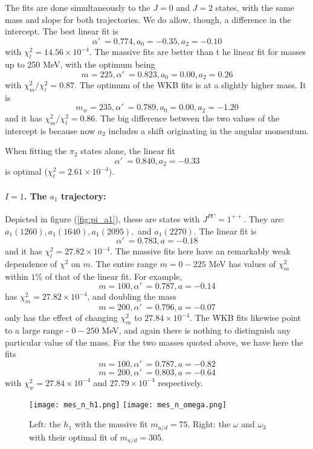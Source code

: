 \documentclass[11pt,a4]{article}
\newcommand{\alp}{\ensuremath{\alpha'\:}}
\newcommand{\rchi}[1]{\ensuremath{\chi^2_m/\chi^2_l = #1}}
\newcommand{\ten}[1]{\times10^{#1}}
\newcommand{\mud}{m_{u/d}}
\begin{document}
				The fits are done simultaneously to the \(J = 0\) and \(J = 2\) states, with the same mass and slope for both trajectories. We do allow, though, a difference in the intercept. The best linear fit is
				\[ \alp = 0.774, a_0 = -0.35, a_2 = -0.10 \]
				with \(\chi^2_l = 14.56\ten{-4}\). The massive fits are better than t
he linear fit for masses up to 250 MeV, with the optimum being
				\[ m = 225, \alp = 0.823, a_0 = 0.00, a_2 = 0.26 \]
				with \rchi{0.87}. The optimum of the WKB fits is at a slightly higher mass. It is
				\[ m_w = 235, \alp = 0.789, a_0 = 0.00, a_2 = -1.20 \]
				and it has \rchi{0.86}. The big difference between the two values of the intercept is because now \(a_2\) includes a shift originating in the angular momentum.
				
				When fitting the \(\pi_2\) states alone, the linear fit
				\[ \alp = 0.840, a_2 = -0.33 \]
				is optimal (\(\chi^2_l = 2.61\ten{-4}\)).
				
				\paragraph{\(I = 1\). The \(a_1\) trajectory:} Depicted in figure (\ref{fig:pi_a1}), these are states with \(J^{PC} = 1^{++}\). They are: \(a_1(1260), a_1(1640), a_1(2095),\) and \(a_1(2270)\). The linear fit is
				\[ \alp = 0.783, a = -0.18 \]
				and it has \(\chi^2_l = 27.82\ten{-4}\). The massive fits here have an remarkably weak dependence of \(\chi^2\) on \(m\). The entire range \(m = 0-225\) MeV has values of \(\chi^2_m\) within \(1\%\) of that of the linear fit. For example,
				\[ m = 100, \alp = 0.787, a = -0.14\]
				has \(\chi^2_m = 27.82\ten{-4}\), and doubling the mass
				\[ m = 200, \alp = 0.796, a = -0.07\]
				only has the effect of changing \(\chi^2_m\) to \(27.84\ten{-4}\). The WKB fits likewise point to a large range - \(0-250\) MeV, and again there is nothing to distinguish any particular value of the mass. For the two masses quoted above, we have here the fits
				\[ m = 100, \alp = 0.787, a = -0.82 \]
				\[ m = 200, \alp = 0.803, a = -0.64 \]
				with \(\chi^2_w = 27.84\ten{-4}\) and \(27.79\ten{-4}\) respectively.
			
				\begin{figure}[tbp] \centering
						\texttt{[image: mes\_n\_h1.png]}	 \hfill
						\texttt{[image: mes\_n\_omega.png]}
						\caption{\label{fig:h1_omega} Left: the \(h_1\) with the massive fit \(\mud = 75\). Right: the \(\omega\) and \(\omega_3\) with their optimal fit of \(\mud = 305\).}
				\end{figure}
\end{document}
